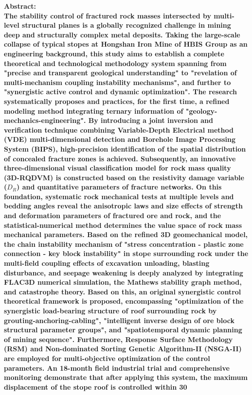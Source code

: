 \documentclass[twocolumn,a4paper,10pt]{article}
\begin{document}

\begin{center}
\small \bfseries Abstract: \\
\small The stability control of fractured rock masses intersected by multi-level structural planes is a globally recognized challenge in mining deep and structurally complex metal deposits. Taking the large-scale collapse of typical stopes at Hongshan Iron Mine of HBIS Group as an engineering background, this study aims to establish a complete theoretical and technological methodology system spanning from "precise and transparent geological understanding" to "revelation of multi-mechanism coupling instability mechanisms", and further to "synergistic active control and dynamic optimization". The research systematically proposes and practices, for the first time, a refined modeling method integrating ternary information of "geology-mechanics-engineering". By introducing a joint inversion and verification technique combining Variable-Depth Electrical method (VDE) multi-dimensional detection and Borehole Image Processing System (BIPS), high-precision identification of the spatial distribution of concealed fracture zones is achieved. Subsequently, an innovative three-dimensional visual classification model for rock mass quality (3D-RQDVM) is constructed based on the resistivity damage variable ($D_R$) and quantitative parameters of fracture networks. On this foundation, systematic rock mechanical tests at multiple levels and bedding angles reveal the anisotropic laws and size effects of strength and deformation parameters of fractured ore and rock, and the statistical-numerical method determines the value space of rock mass mechanical parameters. Based on the refined 3D geomechanical model, the chain instability mechanism of "stress concentration - plastic zone connection - key block instability" in stope surrounding rock under the multi-field coupling effects of excavation unloading, blasting disturbance, and seepage weakening is deeply analyzed by integrating FLAC3D numerical simulation, the Mathews stability graph method, and catastrophe theory. Based on this, an original synergistic control theoretical framework is proposed, encompassing "optimization of the synergistic load-bearing structure of roof surrounding rock by grouting-anchoring-cabling", "intelligent inverse design of ore block structural parameter groups", and "spatiotemporal dynamic planning of mining sequence". Furthermore, Response Surface Methodology (RSM) and Non-dominated Sorting Genetic Algorithm-II (NSGA-II) are employed for multi-objective optimization of the control parameters. An 18-month field industrial trial and comprehensive monitoring demonstrate that after applying this system, the maximum displacement of the stope roof is controlled within 30%
\end{center}
\end{document}
